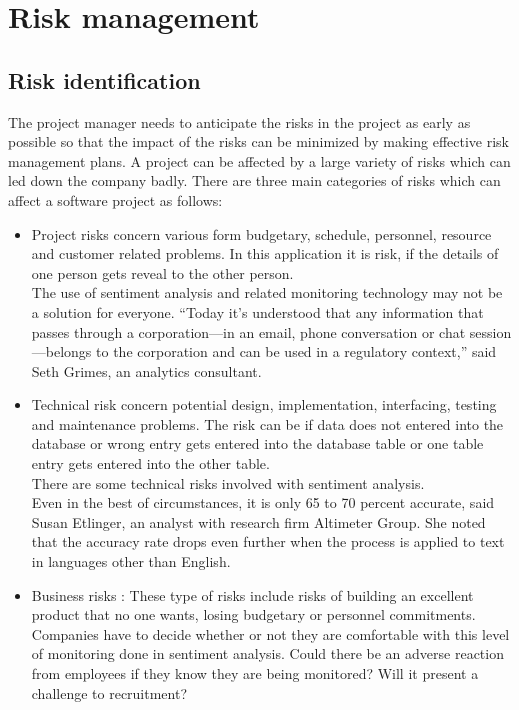 \section{Risk management}
\subsection{Risk identification}
The project manager needs to anticipate the risks in the project as early as possible so that the impact of the
risks can be minimized by making effective risk management plans. A project can be affected by a large variety
of risks which can led down the company badly. There are three main categories of risks which can affect a
software project as follows:
\begin{itemize}
\item Project risks concern various form budgetary, schedule, personnel, resource and customer related
problems. In this application it is risk, if the details of one person gets reveal to the other person.\\
The use of sentiment analysis and related monitoring technology may not be a solution for everyone. “Today it’s understood that any information that passes through a corporation—in an email, phone conversation or chat session—belongs to the corporation and can be used in a regulatory context,” said Seth Grimes, an analytics consultant.
\item Technical risk concern potential design, implementation, interfacing, testing and maintenance
problems. The risk can be if data does not entered into the database or wrong entry gets entered into the database 
table or one table entry gets entered into the other table.
\\
There are some technical risks involved with sentiment analysis.\\
Even in the best of circumstances, it is only 65 to 70 percent accurate, said Susan Etlinger, an analyst with research firm Altimeter Group. She noted that the accuracy rate drops even further when the process is applied to text in languages other than English.
\item Business risks : These type of risks include risks of building an excellent product that no one wants, losing
budgetary or personnel commitments.\\
Companies have to decide whether or not they are comfortable with this level of monitoring done in sentiment analysis. Could there be an adverse reaction from employees if they know they are being monitored? Will it present a challenge to recruitment? 

\end{itemize}
